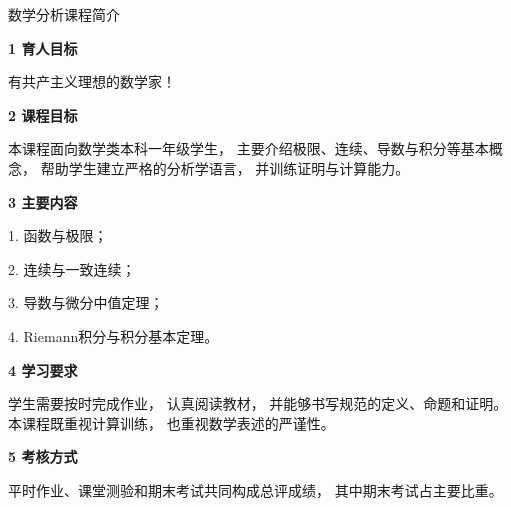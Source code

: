 \documentclass[UTF8]{ctexart}
\begin{document}
\begin{center}
{\LARGE 数学分析课程简介}
\end{center}

\vspace{1em}

\begin{center}
\Large\bfseries 1 育人目标
\end{center}

有共产主义理想的数学家！

\begin{center}
\Large\bfseries 2 课程目标
\end{center}

本课程面向数学类本科一年级学生，
主要介绍极限、连续、导数与积分等基本概念，
帮助学生建立严格的分析学语言，
并训练证明与计算能力。

\vspace{1em}

\begin{center}
\Large\bfseries 3 主要内容
\end{center}

1. 函数与极限；
\vspace{1em}

2. 连续与一致连续；
\vspace{1em}

3. 导数与微分中值定理；
\vspace{1em}

4. Riemann积分与积分基本定理。

\vspace{1em}

\begin{center}
\Large\bfseries 4 学习要求
\end{center}

学生需要按时完成作业，
认真阅读教材，
并能够书写规范的定义、命题和证明。
本课程既重视计算训练，
也重视数学表述的严谨性。

\vspace{1em}

\begin{center}
\Large\bfseries 5 考核方式
\end{center}

平时作业、课堂测验和期末考试共同构成总评成绩，
其中期末考试占主要比重。
\end{document}
